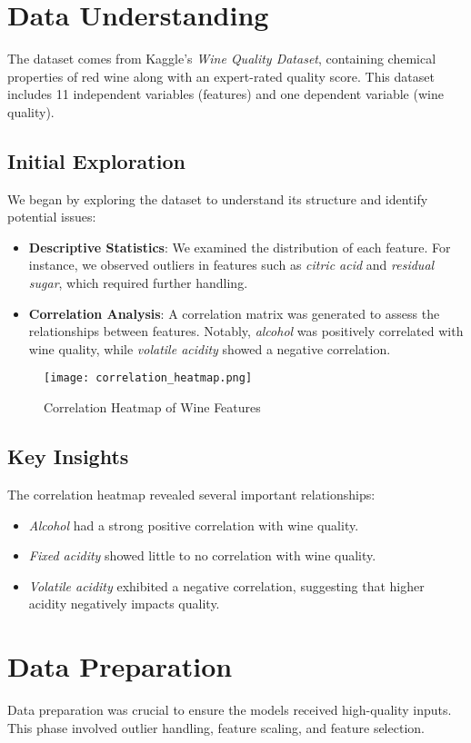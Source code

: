 \documentclass{article}
\begin{document}
\section{Data Understanding}
The dataset comes from Kaggle's \textit{Wine Quality Dataset}, containing chemical properties of red wine along with an expert-rated quality score. This dataset includes 11 independent variables (features) and one dependent variable (wine quality).

\subsection{Initial Exploration}
We began by exploring the dataset to understand its structure and identify potential issues:
\begin{itemize}
    \item \textbf{Descriptive Statistics}: We examined the distribution of each feature. For instance, we observed outliers in features such as \textit{citric acid} and \textit{residual sugar}, which required further handling.
    \item \textbf{Correlation Analysis}: A correlation matrix was generated to assess the relationships between features. Notably, \textit{alcohol} was positively correlated with wine quality, while \textit{volatile acidity} showed a negative correlation.
\end{itemize}

\begin{figure}[h]
    \centering
    \texttt{[image: correlation\_heatmap.png]}
    \caption{Correlation Heatmap of Wine Features}
\end{figure}

\subsection{Key Insights}
The correlation heatmap revealed several important relationships:
\begin{itemize}
    \item \textit{Alcohol} had a strong positive correlation with wine quality.
    \item \textit{Fixed acidity} showed little to no correlation with wine quality.
    \item \textit{Volatile acidity} exhibited a negative correlation, suggesting that higher acidity negatively impacts quality.
\end{itemize}

\section{Data Preparation}
Data preparation was crucial to ensure the models received high-quality inputs. This phase involved outlier handling, feature scaling, and feature selection.
\end{document}

